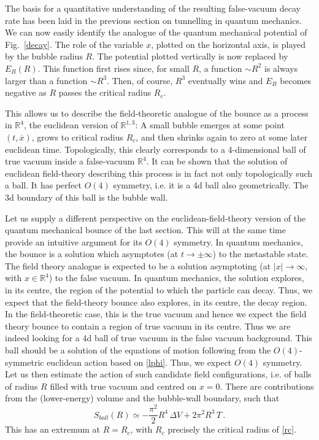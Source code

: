 \documentclass[12pt]{article}
\newcommand{\be}{\begin{equation}}
\newcommand{\ee}{\end{equation}}
\numberwithin{equation}{section}
\begin{document}
The basis for a quantitative understanding of the resulting false-vacuum decay rate has been laid in the previous section on tunnelling in quantum mechanics. We can now easily identify the analogue of the quantum mechanical potential of Fig.~\ref{decay}. The role of the variable $x$, plotted on the horizontal axis, is played by the bubble radius $R$. The potential plotted vertically is now replaced by $E_B(R)$. This function first rises since, for small $R$, a function $\sim R^2$ is always larger than a function $\sim R^3$. Then, of course, $R^3$ eventually wins and $E_B$ becomes negative as $R$ passes the critical radius $R_c$. 

This allows us to describe the field-theoretic analogue of the bounce as a process in $\mathbb{R}^4$, the euclidean version of $\mathbb{R}^{1,3}$: A small bubble emerges at some point $(t,\overline{x})$, grows to critical radius $R_c$, and then shrinks again to zero at some later euclidean time. Topologically, this clearly corresponds to a 4-dimensional ball of true vacuum inside a false-vacuum $\mathbb{R}^4$. It can be shown \cite{Coleman:1977th} that the solution of euclidean field-theory describing this process is in fact not only topologically such a ball. It has  perfect $O(4)$ symmetry, i.e. it is a 4d ball also geometrically. The 3d boundary of this ball is the bubble wall.

Let us supply a different perspective on the euclidean-field-theory version of the quantum mechanical bounce of the last section. This will at the same time provide an intuitive argument for its $O(4)$ symmetry. In quantum mechanics, the bounce is a solution which asymptotes (at $t\to\pm\infty$) to the metastable state. The field theory analogue is expected to be a solution asymptoting (at $|x|\to\infty$, with $x\in\mathbb{R}^4$) to the false vacuum. In quantum mechanics, the solution explores, in its centre, the region of the potential to which the particle can decay. Thus, we expect that the field-theory bounce also explores, in its centre, the decay region. In the field-theoretic case, this is the true vacuum and hence we expect the field theory bounce to contain a region of true vacuum in its centre. Thus we are indeed looking for a 4d ball of true vacuum in the false vacuum background. This ball should be a solution of the equations of motion following from the $O(4)$-symmetric euclidean action based on \eqref{lphi}. Thus, we expect $O(4)$ symmetry. Let us then estimate the action of such candidate field configurations, i.e. of balls of radius $R$ filled with true vacuum and centred on $x=0$. There are contributions from the (lower-energy) volume and the bubble-wall boundary, such that
\be
S_{ball}(R)\simeq -\frac{\pi^2}{2}R^4\,\Delta V+2\pi^2R^3\,T\,.
\ee
This has an extremum at $R=R_c$, with $R_c$ precisely the critical radius of \eqref{rc}.
\end{document}
